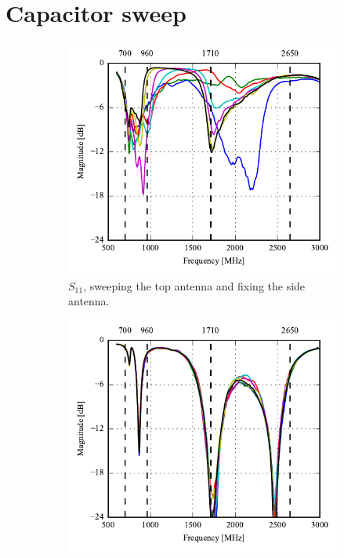 \section{Capacitor sweep}
\begin{figure}[htbp]
    \centering
    \begin{subfigure}{0.49\linewidth}
        \centering
        \includegraphics{img/tech_sol/nonresonant/prototype/s11_csh1.pdf}
        \caption{$S_{11}$, sweeping the top antenna and fixing the side antenna.}
    \end{subfigure}
    \hfill
    \begin{subfigure}{0.49\linewidth}
        \centering
        \includegraphics{img/tech_sol/nonresonant/prototype/s22_csh1.pdf}

\end{subfigure}
\end{figure}
